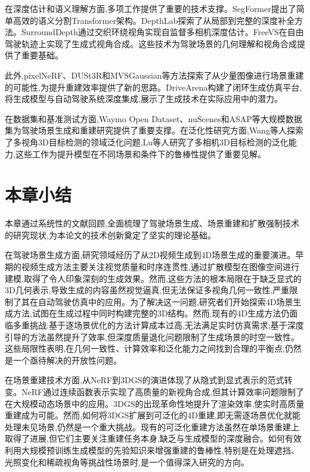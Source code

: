 在深度估计和语义理解方面,多项工作\cite{xie2021segformer,liu2024depthlab,wei2023surrounddepth,wang2024freevs}提供了重要的技术支撑。SegFormer\cite{xie2021segformer}提出了简单高效的语义分割Transformer架构。DepthLab\cite{liu2024depthlab}探索了从局部到完整的深度补全方法。SurroundDepth\cite{wei2023surrounddepth}通过交织环绕视角实现自监督多相机深度估计。FreeVS\cite{wang2024freevs}在自由驾驶轨迹上实现了生成式视角合成。这些技术为驾驶场景的几何理解和视角合成提供了重要基础。

此外,pixelNeRF\cite{yu2021pixelnerf}、DUSt3R\cite{wang2023dust3r}和MVSGaussian\cite{liu2024mvsgaussian}等方法探索了从少量图像进行场景重建的可能性,为提升重建效率提供了新的思路。DriveArena\cite{yang2024drivearena}构建了闭环生成仿真平台,将生成模型与自动驾驶系统深度集成,展示了生成技术在实际应用中的潜力。

在数据集和基准测试方面,Waymo Open Dataset\cite{sun2020waymo}、nuScenes\cite{caesar2020nuscenes}和ASAP\cite{wang2022asap}等大规模数据集为驾驶场景生成和重建研究提供了重要支撑。在泛化性研究方面,Wang等人\cite{wang2023domain}探索了多视角3D目标检测的领域泛化问题,Lu等人\cite{lu2024generalizable}研究了多相机3D目标检测的泛化能力,这些工作为提升模型在不同场景和条件下的鲁棒性提供了重要见解。

\section{本章小结}

本章通过系统性的文献回顾,全面梳理了驾驶场景生成、场景重建和扩散强制技术的研究现状,为本论文的技术创新奠定了坚实的理论基础。

在驾驶场景生成方面,研究领域经历了从2D视频生成到4D场景生成的重要演进。早期的视频生成方法主要关注视觉质量和时序连贯性,通过扩散模型在图像空间进行建模,取得了令人印象深刻的生成效果。然而,这些方法的根本局限在于缺乏显式的3D几何表示,导致生成的内容虽然视觉逼真,但无法保证多视角几何一致性,严重限制了其在自动驾驶仿真中的应用。为了解决这一问题,研究者们开始探索4D场景生成方法,试图在生成过程中同时构建完整的3D结构。然而,现有的4D生成方法仍面临多重挑战:基于逐场景优化的方法计算成本过高,无法满足实时仿真需求;基于深度引导的方法虽然提升了效率,但深度质量退化问题限制了生成场景的时空一致性。这些局限性表明,在几何一致性、计算效率和泛化能力之间找到合理的平衡点,仍然是一个亟待解决的开放性问题。

在场景重建技术方面,从NeRF到3DGS的演进体现了从隐式到显式表示的范式转变。NeRF通过连续函数表示实现了高质量的新视角合成,但其计算效率问题限制了在大规模动态场景中的应用。3DGS的出现革命性地提升了渲染效率,使实时高质量重建成为可能。然而,如何将3DGS扩展到可泛化的4D重建,即无需逐场景优化就能处理未见场景,仍然是一个重大挑战。现有的可泛化重建方法虽然在单场景重建上取得了进展,但它们主要关注重建任务本身,缺乏与生成模型的深度融合。如何有效利用大规模预训练生成模型的先验知识来增强重建的鲁棒性,特别是在处理遮挡、光照变化和稀疏视角等挑战性场景时,是一个值得深入研究的方向。

